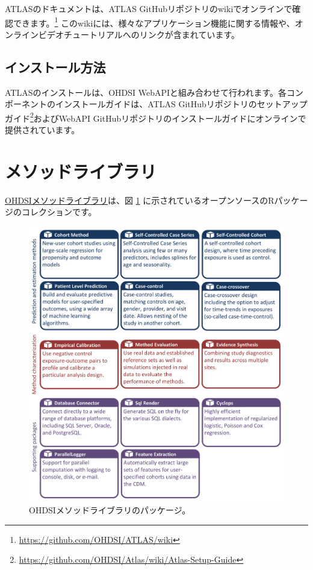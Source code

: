 \documentclass[
  11pt]{book}
\theoremstyle{definition}
\theoremstyle{definition}
\theoremstyle{definition}
\theoremstyle{definition}
\theoremstyle{remark}
\begin{document}
ATLASのドキュメントは、ATLAS GitHubリポジトリのwikiでオンラインで確認できます。\footnote{\url{https://github.com/OHDSI/ATLAS/wiki}} このwikiには、様々なアプリケーション機能に関する情報や、オンラインビデオチュートリアルへのリンクが含まれています。 

\subsection{インストール方法}\label{ux30a4ux30f3ux30b9ux30c8ux30fcux30ebux65b9ux6cd5}

ATLASのインストールは、OHDSI WebAPIと組み合わせて行われます。各コンポーネントのインストールガイドは、ATLAS GitHubリポジトリのセットアップガイド\footnote{\url{https://github.com/OHDSI/Atlas/wiki/Atlas-Setup-Guide}}およびWebAPI GitHubリポジトリのインストールガイドにオンラインで提供されています。 

\section{メソッドライブラリ}\label{ux30e1ux30bdux30c3ux30c9ux30e9ux30a4ux30d6ux30e9ux30ea}

\href{https://ohdsi.github.io/MethodsLibrary/}{OHDSIメソッドライブラリ}は、図 \ref{fig:methodsLibrary} に示されているオープンソースのRパッケージのコレクションです。 

\begin{figure}

{\centering \includegraphics[width=1\linewidth]{images/OhdsiAnalyticsTools/methodsLibrary} 

}

\caption{OHDSIメソッドライブラリのパッケージ。}\label{fig:methodsLibrary}
\end{figure}
\end{document}
